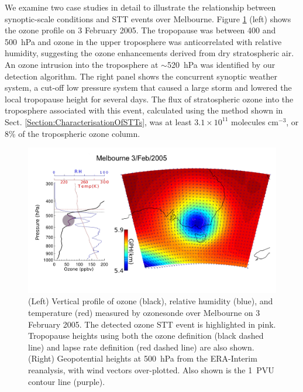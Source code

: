 \documentclass[acp, manuscript]{copernicus} %
\begin{document}
    We examine two case studies in detail to illustrate the relationship between synoptic-scale conditions and STT events  over Melbourne.
    Figure \ref{fig:Melbourne20050203} (left) shows the ozone profile on 3 February 2005.
    The tropopause was between 400 and 500~hPa and ozone in the upper troposphere was anticorrelated with relative humidity, suggesting the ozone enhancements derived from dry stratospheric air. 
    An ozone intrusion into the troposphere at $\sim$520~hPa was identified by our detection algorithm.
    The right panel shows the concurrent synoptic weather system, a cut-off low pressure system that caused a large storm and lowered the local tropopause height for several days.
    The flux of stratospheric ozone into the troposphere associated with this event, calculated using the method shown in Sect. \ref{Section:CharacterisationOfSTTs}, was at least $3.1 \times 10^{11}$ molecules cm$^{-3}$, or 8\% of the tropospheric ozone column.

    \begin{figure}[t]
      \includegraphics[width=14.0cm]{figures/Melbourne20050203.png}
      \caption{(Left) Vertical profile of ozone (black), relative humidity (blue), and temperature (red) measured by ozonesonde over Melbourne on 3 February 2005.
      The detected ozone STT event is highlighted in pink.
      Tropopause heights using both the ozone definition (black dashed line) and lapse rate definition (red dashed line) are also shown.
      (Right) Geopotential heights at 500~hPa from the ERA-Interim reanalysis, with wind vectors over-plotted.
      Also shown is the 1~PVU contour line (purple).}
      \label{fig:Melbourne20050203}
    \end{figure}
    
\end{document}
